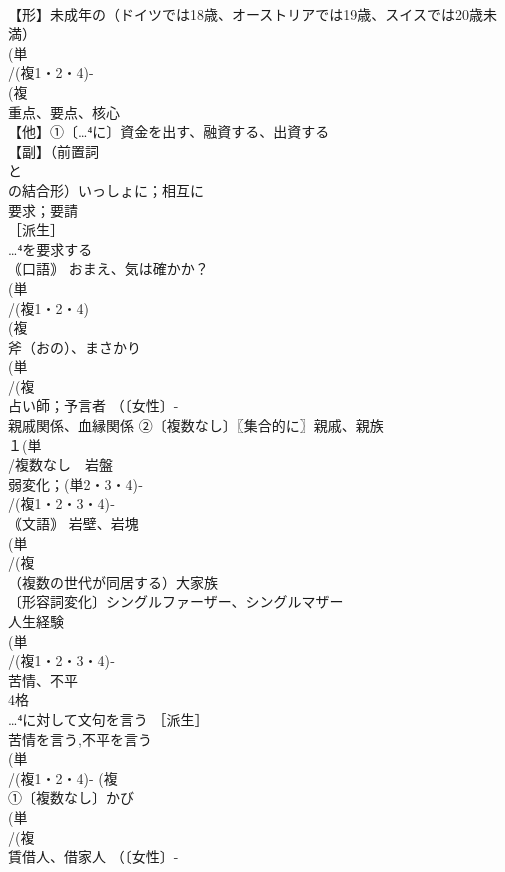 \documentclass[8pt]{extreport}
\begin{document}
\begin{CJK}{UTF8}{min}
\\	【形】未成年の（ドイツでは18歳、オーストリアでは19歳、スイスでは20歳未満） 
\\	(単
\\	/(複1・2・4)-
\\	(複
\\	重点、要点、核心
\\	【他】①〔…⁴に〕資金を出す、融資する、出資する 
\\	【副】（前置詞
\\	と
\\	の結合形）いっしょに；相互に
\\	要求；要請 
\\	［派生］
\\	…⁴を要求する
\\	｟口語｠ おまえ、気は確かか？ 
\\	(単
\\	/(複1・2・4)
\\	(複
\\	斧（おの）、まさかり 
\\	(単
\\	/(複
\\	占い師；予言者 （〔女性〕-
\\	親戚関係、血縁関係 ②〔複数なし〕〖集合的に〗親戚、親族
\\	１(単
\\	/複数なし　岩盤 
\\	弱変化；(単2・3・4)‐
\\	/(複1・2・3・4)‐
\\	｟文語｠ 岩壁、岩塊 
\\	(単
\\	/(複
\\	（複数の世代が同居する）大家族 
\\	〔形容詞変化〕シングルファーザー、シングルマザー 
\\	人生経験 
\\	(単
\\	/(複1・2・3・4)‐
\\	苦情、不平 
\\	4格 
\\	…⁴に対して文句を言う ［派生］ 
\\	苦情を言う,不平を言う
\\	(単
\\	/(複1・2・4)- (複
\\	①〔複数なし〕かび 
\\	(単
\\	/(複
\\	賃借人、借家人 （〔女性〕-

\end{CJK}
\end{document}
